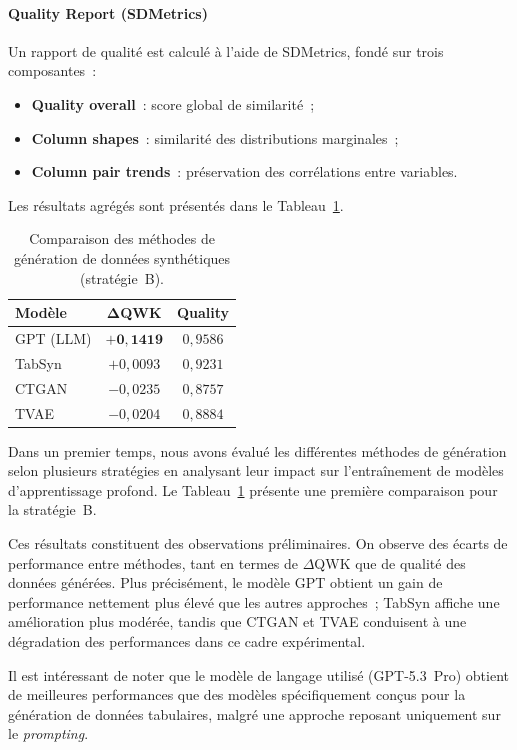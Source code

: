 \documentclass[conference]{IEEEtran}
\begin{document}
\paragraph{Quality Report (SDMetrics)}
Un rapport de qualité est calculé à l'aide de SDMetrics, fondé sur trois composantes~:
\begin{itemize}
    \item \textbf{Quality overall}~: score global de similarité~;
    \item \textbf{Column shapes}~: similarité des distributions marginales~;
    \item \textbf{Column pair trends}~: préservation des corrélations entre variables.
\end{itemize}

Les résultats agrégés sont présentés dans le Tableau~\ref{tab:gen_synthetique}.

\begin{table}[htbp]
\centering
\caption{Comparaison des méthodes de génération de données synthétiques (stratégie~B).}
\label{tab:gen_synthetique}
\begin{tabular}{lcc}
\toprule
\textbf{Modèle} & $\boldsymbol{\Delta}$\textbf{QWK} & \textbf{Quality} \\
\midrule
GPT (LLM) & $\mathbf{+0{,}1419}$ & $0{,}9586$ \\
TabSyn    & $+0{,}0093$          & $0{,}9231$ \\
CTGAN     & $-0{,}0235$          & $0{,}8757$ \\
TVAE      & $-0{,}0204$          & $0{,}8884$ \\
\bottomrule
\end{tabular}
\end{table}

Dans un premier temps, nous avons évalué les différentes méthodes de génération selon plusieurs stratégies en analysant leur impact sur l'entraînement de modèles d'apprentissage profond. Le Tableau~\ref{tab:gen_synthetique} présente une première comparaison pour la stratégie~B.

Ces résultats constituent des observations préliminaires. On observe des écarts de performance entre méthodes, tant en termes de $\Delta$QWK que de qualité des données générées. Plus précisément, le modèle GPT obtient un gain de performance nettement plus élevé que les autres approches~; TabSyn affiche une amélioration plus modérée, tandis que CTGAN et TVAE conduisent à une dégradation des performances dans ce cadre expérimental.

Il est intéressant de noter que le modèle de langage utilisé (GPT-5.3~Pro) obtient de meilleures performances que des modèles spécifiquement conçus pour la génération de données tabulaires, malgré une approche reposant uniquement sur le \textit{prompting}.
\end{document}
